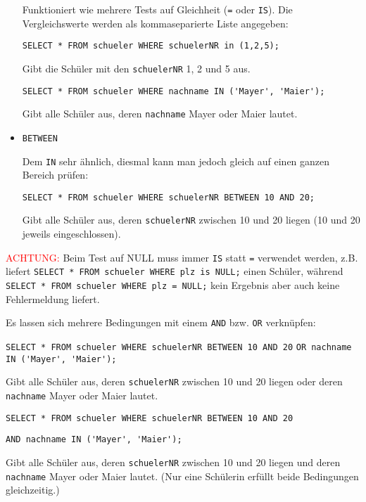\begin{itemize}
	Funktioniert wie mehrere Tests auf Gleichheit (\lstinline!=! oder \lstinline!IS!). Die Vergleichswerte werden als kommaseparierte Liste angegeben:

	\lstinline!SELECT * FROM schueler WHERE schuelerNR in (1,2,5);!

	Gibt die Schüler mit den \lstinline!schuelerNR! 1, 2 und 5 aus.

	\lstinline!SELECT * FROM schueler WHERE nachname IN ('Mayer', 'Maier');!

	Gibt alle Schüler aus, deren \lstinline!nachname! Mayer oder Maier lautet.
	\item \lstinline!BETWEEN!

	Dem \lstinline!IN! sehr ähnlich, diesmal kann man jedoch gleich auf einen ganzen Bereich prüfen:

	\lstinline!SELECT * FROM schueler WHERE schuelerNR BETWEEN 10 AND 20;!

	Gibt alle Schüler aus, deren \lstinline!schuelerNR! zwischen 10 und 20 liegen (10 und 20 jeweils eingeschlossen).
\end{itemize}
\textcolor{red}{ACHTUNG:} Beim Test auf NULL muss immer \lstinline!IS! statt \lstinline!=! verwendet werden, z.B. liefert \lstinline!SELECT * FROM schueler WHERE plz is NULL;! einen Schüler, während \lstinline!SELECT * FROM schueler WHERE plz = NULL;! kein Ergebnis aber auch keine Fehlermeldung liefert.

Es lassen sich mehrere Bedingungen mit einem \lstinline!AND! bzw. \lstinline!OR! verknüpfen:

\lstinline!SELECT * FROM schueler WHERE schuelerNR BETWEEN 10 AND 20!
\lstinline!OR nachname IN ('Mayer', 'Maier');!

Gibt alle Schüler aus, deren \lstinline!schuelerNR! zwischen 10 und 20 liegen oder deren \lstinline!nachname! Mayer oder Maier lautet.

\lstinline!SELECT * FROM schueler WHERE schuelerNR BETWEEN 10 AND 20!

\lstinline!AND nachname IN ('Mayer', 'Maier');!

Gibt alle Schüler aus, deren \lstinline!schuelerNR! zwischen 10 und 20 liegen und deren \lstinline!nachname! Mayer oder Maier lautet. (Nur eine Schülerin erfüllt beide Bedingungen gleichzeitig.)

